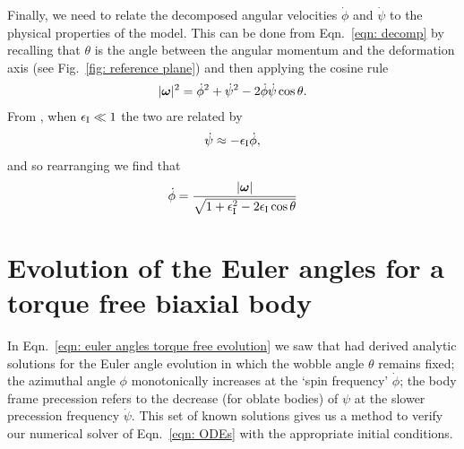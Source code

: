 \documentclass[../full_thesis/full_thesis.tex]{subfiles}
\begin{document}
Finally, we need to relate the decomposed angular
velocities $\dot{\phi}$ and $\dot{\psi}$ to the physical properties of the
model.  This can be done from Eqn.~\eqref{eqn: decomp} by recalling that
$\theta$ is the angle between the angular momentum and the deformation axis
(see Fig.~\ref{fig: reference plane}) and then applying the cosine rule
\begin{align}
|\boldsymbol{\omega}|^{2} = \dot{\phi}^{2}+\dot{\psi}^{2} - 2\dot{\phi}\dot{\psi}\cos\theta.
\end{align}
From \citet{Jones2001}, when $\epsilon_{\mathrm{I}} \ll 1$ the two are related by
\begin{align}
\dot{\psi} \approx - \epsilon_{\mathrm{I}} \dot{\phi},
\end{align}
and so rearranging we find that
\begin{align}
\dot{\phi} = \frac{|\boldsymbol{\omega}|}{\sqrt{1+\epsilon_{\mathrm{I}}^{2} - 2\epsilon_{\mathrm{I}}\cos\theta}}
\end{align}

\section{Evolution of the Euler angles for a torque free biaxial body}
\label{sec: biaxial body with no torque}

In Eqn.~\eqref{eqn: euler angles torque free evolution} we saw that
\citet{Jones2001} had derived analytic solutions for the Euler angle evolution
in which the wobble angle $\theta$ remains fixed; the azimuthal angle $\phi$
monotonically increases at the `spin frequency' $\dot{\phi}$; the body frame
precession refers to the decrease (for oblate bodies) of $\psi$ at the slower
precession frequency $\dot{\psi}$.  This set of known solutions gives us a
method to verify our numerical solver of Eqn.~\eqref{eqn: ODEs} with the
appropriate initial conditions.
\end{document}
